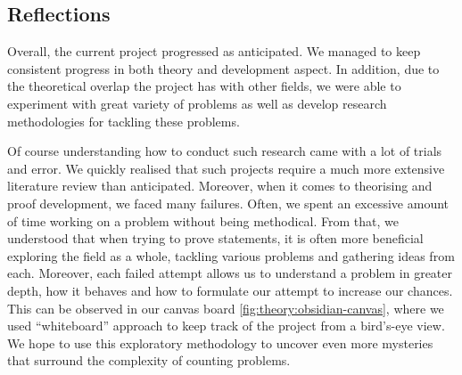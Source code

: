 \subsection{Reflections}

Overall, the current project progressed as anticipated. We managed to keep
consistent progress in both theory and development aspect. In addition,
due to the theoretical overlap the project has with other fields, we
were able to experiment with great variety of problems as well as
develop research methodologies for tackling these problems.

Of course understanding how to conduct such research came with a lot of trials and error.
We quickly realised that such projects require a much more extensive literature review than anticipated.
Moreover, when it comes to theorising and proof development, we faced many failures.
Often, we spent an excessive amount of time working on a problem without being methodical.
From that, we understood that when trying to prove statements, it is often more beneficial
exploring the field as a whole, tackling various problems and gathering ideas from each.
Moreover, each failed attempt allows us to understand a problem in greater depth, how it behaves
and how to formulate our attempt to increase our chances.
This can be observed in our canvas board \ref{fig:theory:obsidian-canvas}, where we
used ``whiteboard'' approach to keep track of the project from a bird's-eye view. 
We hope to use this exploratory methodology to uncover even more mysteries that surround
the complexity of counting problems.



